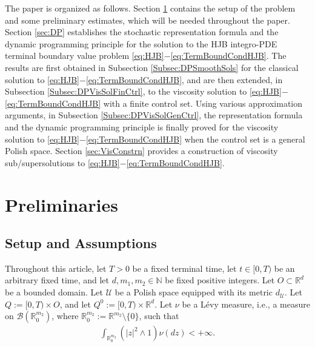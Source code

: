 \documentclass[amscd,amssymb,11pt]{article}
\numberwithin{theorem}{section}
\numberwithin{equation}{section}
\let\Section=\section
\def\section{\setcounter{equation}{0}\Section}\sf
\begin{document}
The paper is organized as follows. Section \ref{sec:preliminary} contains the setup of the problem and some preliminary estimates, which will be needed throughout the paper. Section \ref{sec:DP} establishes the stochastic representation formula and the dynamic programming principle for the solution to the HJB integro-PDE terminal boundary value problem \eqref{eq:HJB}$-$\eqref{eq:TermBoundCondHJB}. The results are first obtained in Subsection \ref{Subsec:DPSmoothSols} for the classical solution to \eqref{eq:HJB}$-$\eqref{eq:TermBoundCondHJB}, and are then extended, in Subsection \ref{Subsec:DPVisSolFinCtrl}, to the viscosity solution to \eqref{eq:HJB}$-$\eqref{eq:TermBoundCondHJB} with a finite control set. Using various approximation arguments, in Subsection \ref{Subsec:DPVisSolGenCtrl}, the representation formula and the dynamic programming principle is finally proved for the viscosity solution to \eqref{eq:HJB}$-$\eqref{eq:TermBoundCondHJB} when the control set is a general Polish space. Section \ref{sec:VisConstrn} provides a construction of viscosity sub/supersolutions to \eqref{eq:HJB}$-$\eqref{eq:TermBoundCondHJB}.



\section{Preliminaries}\label{sec:preliminary}



\subsection{Setup and Assumptions}\label{subsec:Model}


Throughout this article, let $T>0$ be a fixed terminal time, let $t\in[0,T)$ be an arbitrary fixed time, and let $d,m_{1},m_{2}\in\mathbb{N}$ be fixed positive integers. Let $O\subset\mathbb{R}^{d}$ be a bounded domain. Let $\mathcal{U}$ be a Polish space equipped with its metric $d_{\mathcal{U}}$. Let $Q:=[0,T)\times O$, and let $Q^{0}:=[0,T)\times\mathbb{R}^{d}$. Let $\nu$ be a L\'{e}vy measure, i.e., a measure on $\mathcal{B}(\mathbb{R}^{m_{2}}_{0})$, where $\mathbb{R}^{m_{2}}_{0}:=\mathbb{R}^{m_{2}}\setminus\{0\}$, such that
\begin{align*}
\int_{\mathbb{R}^{m_{2}}_{0}}\left(|z|^{2}\wedge 1\right)\nu(dz)<+\infty.
\end{align*}
\end{document}
